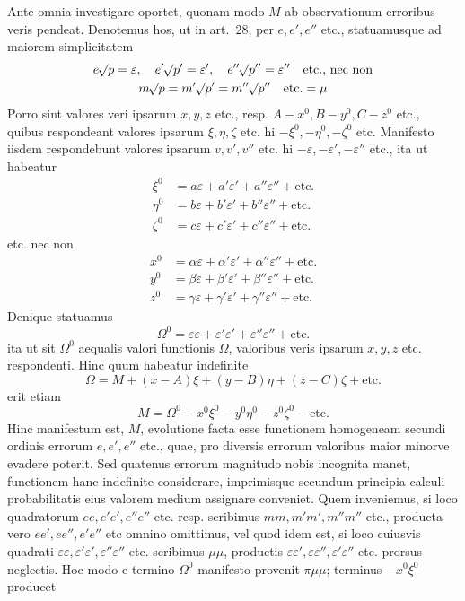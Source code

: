 Ante omnia investigare oportet, quonam modo \(M\) ab observationum erroribus veris pendeat. Denotemus hos, ut in art.\ 28, per \(e,e',e''\) etc., statuamusque ad maiorem simplicitatem
\[
\begin{gathered}
e\mathord{{}^{}\!\surd}p=\varepsilon,\quad e'\mathord{{}^{}\!\surd}p'=\varepsilon',\quad e''\mathord{{}^{}\!\surd}p''=\varepsilon''\quad\text{etc., nec non}\\
m\mathord{{}^{}\!\surd}p=m'\mathord{{}^{}\!\surd}p'=m''\mathord{{}^{}\!\surd}p''\quad\text{etc.}=\mu
\end{gathered}
\]
Porro sint valores veri ipsarum \(x,y,z\) etc., resp. \(A-x^0,\allowbreak B-y^0,\allowbreak C-z^0\) etc., quibus respondeant valores ipsarum \(\xi,\eta,\zeta\) etc. hi \(-\xi^0,-\eta^0,-\zeta^0\) etc. Manifesto iisdem respondebunt valores ipsarum \(v,v',v''\) etc. hi \(-\varepsilon,-\varepsilon',-\varepsilon''\) etc., ita ut habeatur
\[
\begin{aligned}
\xi^0&=a\varepsilon+a'\varepsilon'+a''\varepsilon''+\text{etc.}\\
\eta^0&=b\varepsilon+b'\varepsilon'+b''\varepsilon''+\text{etc.}\\
\zeta^0&=c\varepsilon+c'\varepsilon'+c''\varepsilon''+\text{etc.}
\end{aligned}
\]
etc. nec non
\[
\begin{aligned}
x^0&=\alpha\varepsilon+\alpha'\varepsilon'+\alpha''\varepsilon''+\text{etc.}\\
y^0&=\beta\varepsilon+\beta'\varepsilon'+\beta''\varepsilon''+\text{etc.}\\
z^0&=\gamma\varepsilon+\gamma'\varepsilon'+\gamma''\varepsilon''+\text{etc.}
\end{aligned}
\]
Denique statuamus
\[
\Omega^0=\varepsilon\varepsilon+\varepsilon'\varepsilon'+\varepsilon''\varepsilon''+\text{etc.}
\]
ita ut sit \(\Omega^0\) aequalis valori functionis \(\Omega\), valoribus veris ipsarum \(x,y,z\) etc. respondenti. Hinc quum habeatur indefinite
\[
\Omega=M+(x-A)\xi+(y-B)\eta+(z-C)\zeta+\text{etc.}
\]
erit etiam
\[
M=\Omega^0-x^0\xi^0-y^0\eta^0-z^0\zeta^0-\text{etc.}
\]
Hinc manifestum est, \(M\), evolutione facta esse functionem homogeneam secundi ordinis errorum \(e,e',e''\) etc., quae, pro diversis errorum valoribus maior minorve evadere poterit. Sed quatenus errorum magnitudo nobis incognita manet, functionem hanc indefinite considerare, imprimisque secundum principia calculi probabilitatis eius valorem medium assignare conveniet. Quem inveniemus, si loco quadratorum \(ee,e'e',e''e''\) etc. resp. scribimus \(mm,m'm',m''m''\) etc., producta vero \(ee',ee'',e'e''\) etc omnino omittimus, vel quod idem est, si loco cuiusvis quadrati \(\varepsilon\varepsilon,\varepsilon'\varepsilon',\varepsilon''\varepsilon''\) etc. scribimus \(\mu\mu\), productis \(\varepsilon\varepsilon',\varepsilon\varepsilon'',\varepsilon'\varepsilon''\) etc. prorsus neglectis. Hoc modo e termino \(\Omega^0\) manifesto provenit \(\pi\mu\mu\); terminus \(-x^0\xi^0\) producet
